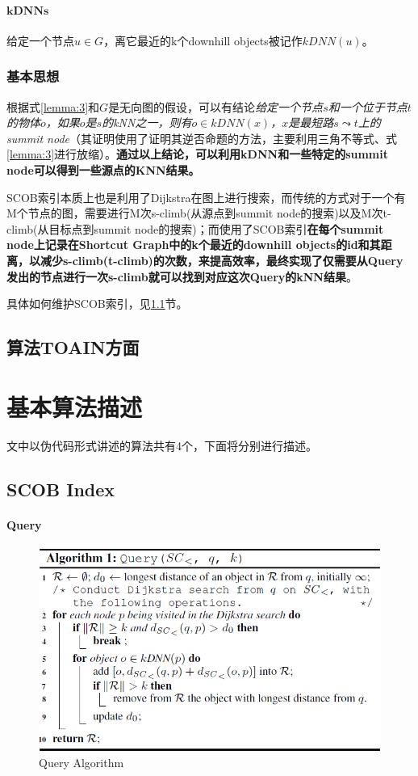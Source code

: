 \documentclass{ML}
\begin{document}
\paragraph{$\mathbf{kDNNs}$}
给定一个节点$u \in G$，离它最近的k个downhill objects被记作$kDNN(u)$。

\subsubsection{基本思想}
根据式\eqref{lemma:3}和$G$是无向图的假设，可以有结论\textit{给定一个节点$s$和一个位于节点$t$的物体$o$，如果$o$是$s$的kNN之一，则有$o \in kDNN(x)$，$x$是最短路$s \leadsto t$上的summit node}（其证明使用了证明其逆否命题的方法，主要利用三角不等式、式\eqref{lemma:3}进行放缩）。\textbf{通过以上结论，可以利用kDNN和一些特定的summit node可以得到一些源点的KNN结果。}

SCOB索引本质上也是利用了Dijkstra在图上进行搜索，而传统的方式对于一个有M个节点的图，需要进行M次s-climb(从源点到summit node的搜索)以及M次t-climb(从目标点到summit node的搜索)；而使用了SCOB索引\textbf{在每个summit node上记录在Shortcut Graph中的k个最近的downhill objects的id和其距离，以减少s-climb(t-climb)的次数，来提高效率，最终实现了仅需要从Query发出的节点进行一次s-climb就可以找到对应这次Query的kNN结果}。

具体如何维护SCOB索引，见\ref{sec:scob_index}节。
\subsection{算法TOAIN方面}
\section{基本算法描述}
文中以伪代码形式讲述的算法共有4个，下面将分别进行描述。
\subsection{SCOB Index}\label{sec:scob_index}
\paragraph{Query}
\begin{figure}[htb]
	\centering
	\includegraphics[width=0.8\linewidth]{media/query.png}
	\caption{Query Algorithm}\label{fig:query}
\end{figure}
\end{document}
